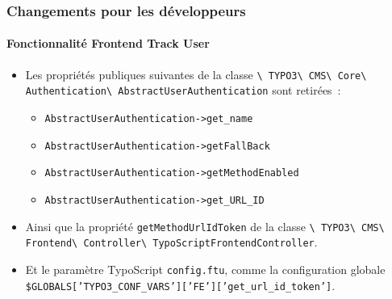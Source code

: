 
\begin{frame}[fragile]
	\frametitle{Changements pour les développeurs}
	\framesubtitle{Fonctionnalité Frontend Track User}

	\begin{itemize}

		\item Les propriétés publiques suivantes de la classe\newline
			\smaller\texttt{\textbackslash
				TYPO3\textbackslash
				CMS\textbackslash
				Core\textbackslash
				Authentication\textbackslash
				AbstractUserAuthentication}
			\normalsize\newline
			sont retirées~:

			\begin{itemize}\smaller
				\item \texttt{AbstractUserAuthentication->get\_name}
				\item \texttt{AbstractUserAuthentication->getFallBack}
				\item \texttt{AbstractUserAuthentication->getMethodEnabled}
				\item \texttt{AbstractUserAuthentication->get\_URL\_ID}
			\end{itemize}\normalsize

		\item Ainsi que la propriété \texttt{getMethodUrlIdToken} de la classe\newline
			\smaller\texttt{\textbackslash
				TYPO3\textbackslash
				CMS\textbackslash
				Frontend\textbackslash
				Controller\textbackslash
				TypoScriptFrontendController}.
			\normalsize

		\item Et le paramètre TypoScript \texttt{config.ftu},
			comme la configuration globale
			{\fontsize{8}{8}\selectfont\texttt{\$GLOBALS['TYPO3\_CONF\_VARS']['FE']['get\_url\_id\_token']}.}

	\end{itemize}

\end{frame}


